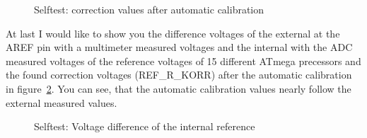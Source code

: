\begin{figure}[H]
  \centering
  \resizebox{9cm}{!}{}
  \caption{Selftest: correction values after automatic calibration}
  \label{fig:SelfTrefKorr}
\end{figure}

At last I would like to show you the difference voltages of the external at the
AREF pin with a multimeter measured voltages and the internal with the ADC
measured voltages of the reference voltages of 15 different ATmega precessors
and the found correction voltages (REF\_R\_KORR) after the automatic calibration in
figure~\ref{fig:SelfTrefDiff}.
You can see, that the automatic calibration values nearly follow the external measured values.

\begin{figure}[H]
  \centering
  \resizebox{9cm}{!}{}
  \caption{Selftest: Voltage difference of the internal reference}
  \label{fig:SelfTrefDiff}
\end{figure}

